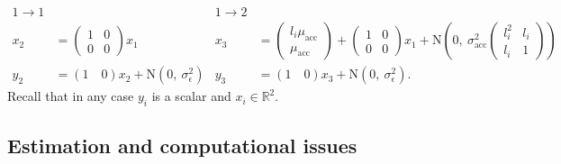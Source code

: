 \documentclass[aoas]{imsart}
\begin{document}
{\footnotesize
\begin{align*}
  1\rightarrow 1 && 1\rightarrow 2\\
  x_{2} &= 
  \begin{pmatrix}1&0\\0&0\end{pmatrix} x_{1} 
        &   x_{3}
                    &= \begin{pmatrix} l_i\mu_{\textrm{acc}}\\ \mu_{\textrm{acc}}\end{pmatrix} +
  \begin{pmatrix}1&0\\0&0\end{pmatrix} x_{1} +
                         \mbox{N}\left(0,\ \sigma_{\textrm{acc}}^2\begin{pmatrix} l_i^2 & l_i\\ l_i & 1 \end{pmatrix}\right)\\
  y_2 &= (1\quad  0)  x_2 + \mbox{N}(0,\
                                 \sigma_\epsilon^2) &
y_3 &= (1\quad  0) x_3 + \mbox{N}(0,\
                                 \sigma_\epsilon^2).
\end{align*}
}%
Recall that in any case $y_i$ is a scalar and $x_i \in \mathbb{R}^2$.


\subsection{Estimation and computational issues}
\label{sec:computational-issues}
\end{document}
